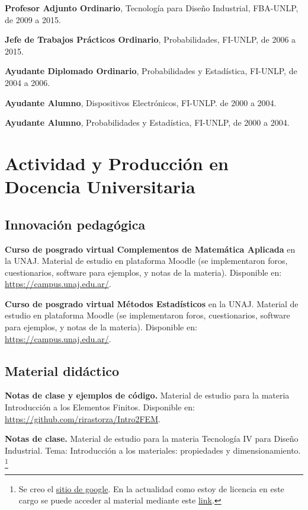 \documentclass[margin,line]{res}
\begin{document}
\begin{resume}
{\bf Profesor Adjunto Ordinario}, Tecnología para Diseño Industrial, FBA-UNLP, de 2009 a 2015.

{\bf Jefe de Trabajos Prácticos Ordinario}, Probabilidades, FI-UNLP, de 2006 a 2015.

{\bf Ayudante Diplomado Ordinario}, Probabilidades y Estadística, FI-UNLP, de 2004 a 2006.

{\bf Ayudante Alumno}, Dispositivos Electrónicos, FI-UNLP. de 2000 a 2004.

{\bf Ayudante Alumno}, Probabilidades y Estadística, FI-UNLP, de 2000 a 2004.

\section{ Actividad y Producción en Docencia Universitaria}
\vspace*{-.2in}

\subsection{ Innovación pedagógica}

\textbf{Curso de posgrado virtual Complementos de Matemática Aplicada} en la UNAJ. Material de estudio en plataforma Moodle (se implementaron foros, cuestionarios, software para ejemplos, y notas de la materia). Disponible en: \url{https://campus.unaj.edu.ar/}.

\textbf{Curso de posgrado virtual Métodos Estadísticos} en la UNAJ. Material de estudio en plataforma Moodle (se implementaron foros, cuestionarios, software para ejemplos, y notas de la materia). Disponible en: \url{https://campus.unaj.edu.ar/}.

% 

\subsection{ Material didáctico}

\textbf{Notas de clase y ejemplos de código.} Material de estudio para la materia Introducción a los Elementos Finitos. Disponible en: \url{https://github.com/rirastorza/Intro2FEM}.


\textbf{Notas de clase.} Material de estudio para la materia Tecnología IV para Diseño Industrial. Tema: Introducción a los materiales: propiedades y dimensionamiento. \footnote{Se creo el \href{https://sites.google.com/site/catedratecnologia/}{sitio de google}. En la actualidad como estoy de licencia en este cargo se puede acceder al material mediante este \href{https://docs.google.com/viewer?a=v\&pid=sites\&srcid=ZGVmYXVsdGRvbWFpbnxjYXRlZHJhdGVjbm9sb2dpYXxneDoyMmYyZmRiNWYzN2JkNDMy}{link}.}


\end{resume}
\end{document}
